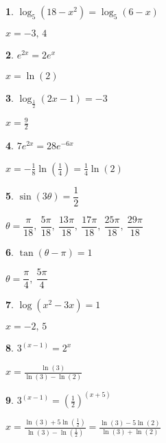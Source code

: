 \documentclass{amsbook}
\newtheorem{exc}{}
\newenvironment{ex}{\begin{exc}\normalfont}{\end{exc}}
\numberwithin{section}{chapter}
\numberwithin{equation}{chapter}
\begin{document}
\begin{multicols}{2}
\begin{ex}
	$\log_{5}\left(18-x^2\right) = \log_{5}(6-x)$
	\begin{sol}
		$x=-3,\, 4$
	\end{sol}
\end{ex}

\begin{ex}
	$e^{2x} = 2e^{x}$ 
	\begin{sol}
		$x =  \ln(2)$
	\end{sol}
\end{ex}


\begin{ex}
	$\log_{\frac{1}{2}} (2x-1) = -3$
	\begin{sol}
		$x=\frac{9}{2}$
	\end{sol}
\end{ex}

\begin{ex}
	$7e^{2x} = 28e^{-6x}$ 
	\begin{sol}
		$x = -\frac{1}{8} \ln\left(\frac{1}{4} \right) = \frac{1}{4}\ln(2)$
	\end{sol}
\end{ex}


\begin{ex}
	$\sin(3\theta) = \dfrac{1}{2}$
	\begin{sol}
		$\theta = \dfrac{\pi}{18},\ \dfrac{5\pi}{18},\ \dfrac{13\pi}{18},\ \dfrac{17\pi}{18},\ \dfrac{25\pi}{18},\ \dfrac{29\pi}{18}$
	\end{sol}
\end{ex}


\begin{ex}
	$\tan\left(\theta-\pi\right) = 1$
	\begin{sol}
		$\theta = \dfrac{\pi}{4},\ \dfrac{5\pi}{4}$
	\end{sol}
\end{ex}

\begin{ex}
	$\log(x^2-3x) = 1$
	\begin{sol}
		$x=-2,\, 5$
	\end{sol}
\end{ex}

\begin{ex}
	$3^{(x - 1)} = 2^{x}$ 
	\begin{sol}
		$x = \frac{\ln(3)}{\ln(3) - \ln(2)}$
	\end{sol}
\end{ex}

\begin{ex}
	$3^{(x - 1)} = \left(\frac{1}{2}\right)^{(x + 5)}$ 
	\begin{sol}
		$x = \frac{\ln(3) + 5\ln\left(\frac{1}{2}\right)}{\ln(3) - \ln\left(\frac{1}{2}\right)} = \frac{\ln(3)-5\ln(2)}{\ln(3)+\ln(2)}$
	\end{sol}
\end{ex}



\end{multicols}
\end{document}

